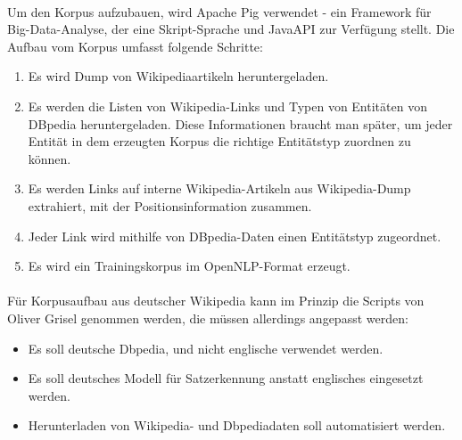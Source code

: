 \paragraph{}
Um den Korpus aufzubauen, wird Apache Pig verwendet - ein Framework für Big-Data-Analyse, der eine Skript-Sprache und JavaAPI zur Verfügung stellt. Die Aufbau vom Korpus umfasst folgende Schritte:
\begin{enumerate}
\item Es wird Dump von Wikipediaartikeln heruntergeladen.
\item Es werden die Listen von Wikipedia-Links und Typen von Entitäten von DBpedia heruntergeladen. Diese Informationen braucht man später, um jeder Entität in dem erzeugten Korpus die richtige Entitätstyp zuordnen zu können.
\item Es werden Links auf interne Wikipedia-Artikeln aus Wikipedia-Dump extrahiert, mit der Positionsinformation zusammen.
\item Jeder Link wird mithilfe von DBpedia-Daten einen Entitätstyp zugeordnet.
\item Es wird ein Trainingskorpus im OpenNLP-Format erzeugt.
\end{enumerate}

\paragraph{} 
Für Korpusaufbau aus deutscher Wikipedia kann im Prinzip die Scripts von Oliver Grisel genommen werden, die müssen allerdings angepasst werden:
\begin{itemize}
\item Es soll deutsche Dbpedia, und nicht englische verwendet werden.
\item Es soll deutsches Modell für Satzerkennung anstatt englisches eingesetzt werden.
\item Herunterladen von Wikipedia- und Dbpediadaten soll automatisiert werden.
\end{itemize}


